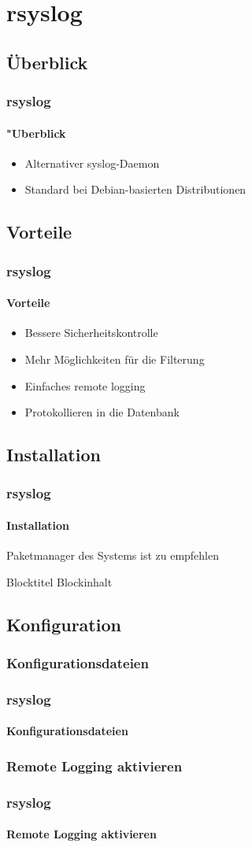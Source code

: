 \section{rsyslog}
\subsection{Überblick}
\begin{frame}
	\frametitle{rsyslog}
	\framesubtitle{"Uberblick}
	\begin{itemize}
		\item Alternativer syslog-Daemon
		\item Standard bei Debian-basierten Distributionen
	\end{itemize}
\end{frame}

\subsection{Vorteile}
\begin{frame}
	\frametitle{rsyslog}
	\framesubtitle{Vorteile}
	\begin{itemize}
		\item Bessere Sicherheitskontrolle
		\item Mehr Möglichkeiten für die Filterung
		\item Einfaches remote logging
		\item Protokollieren in die Datenbank
	\end{itemize}
\end{frame}

\subsection{Installation}
\begin{frame}
	\frametitle{rsyslog}
	\framesubtitle{Installation}
	Paketmanager des Systems ist zu empfehlen
\begin{block}{Blocktitel} 
Blockinhalt
\end{block}

\end{frame}

\subsection{Konfiguration}
\subsubsection{Konfigurationsdateien}
\begin{frame}
	\frametitle{rsyslog}
	\framesubtitle{Konfigurationsdateien}
\end{frame}

\subsubsection{Remote Logging aktivieren}
\begin{frame}
	\frametitle{rsyslog}
	\framesubtitle{Remote Logging aktivieren}
\end{frame}
